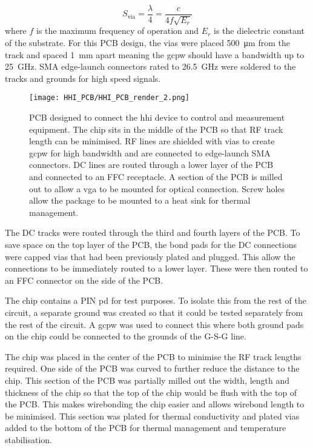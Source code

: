 \begin{equation}
	S_\text{via} = \frac{\lambda}{4} = \frac{c}{4 f \sqrt{E_r}}
\end{equation}
where $f$ is the maximum frequency of operation and $E_r$ is the dielectric constant of the substrate. For this PCB design, the vias were placed \SI{500}{\um} from the track and spaced \SI{1}{\mm} apart meaning the \ac{gcpw} should have a bandwidth up to \SI{25}{GHz}. SMA edge-launch connectors rated to \SI{26.5}{GHz} were soldered to the tracks and grounds for high speed signals.

\begin{figure}[t]
	\centering
	\texttt{[image: HHI\_PCB/HHI\_PCB\_render\_2.png]}
	\caption[PCB breakout for an InP integrated circuit]{PCB designed to connect the \acs{hhi} device to control and measurement equipment. The chip sits in the middle of the PCB so that RF track length can be minimised. RF lines are shielded with vias to create \acs{gcpw} for high bandwidth and are connected to edge-launch SMA connectors. DC lines are routed through a lower layer of the PCB and connected to an FFC receptacle. A section of the PCB is milled out to allow a \acs{vga} to be mounted for optical connection. Screw holes allow the package to be mounted to a heat sink for thermal management.}
	\label{fig:hhi_pcb}
\end{figure}

The DC tracks were routed through the third and fourth layers of the PCB. To save space on the top layer of the PCB, the bond pads for the DC connections were capped vias that had been previously plated and plugged. This allow the connections to be immediately routed to a lower layer. These were then routed to an FFC connector on the side of the PCB.

The chip contains a PIN \ac{pd} for test purposes. To isolate this from the rest of the circuit, a separate ground was created so that it could be tested separately from the rest of the circuit. A \ac{gcpw} was used to connect this where both ground pads on the chip could be connected to the grounds of the G-S-G line.


The chip was placed in the center of the PCB to minimise the RF track lengths required. One side of the PCB was curved to further reduce the distance to the chip. This section of the PCB was partially milled out the width, length and thickness of the chip so that the top of the chip would be flush with the top of the PCB. This makes wirebonding the chip easier and allows wirebond length to be minimised. This section was plated for thermal conductivity and plated vias added to the bottom of the PCB for thermal management and temperature stabilisation. 

